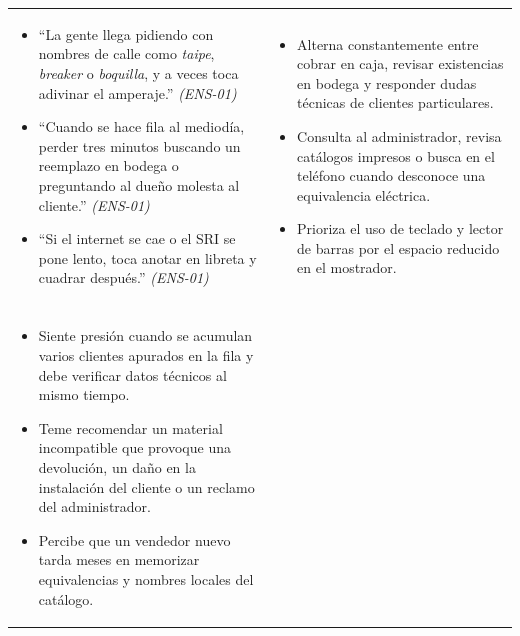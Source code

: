 \vspace{4pt}
{\small
\noindent\begin{tabularx}{\linewidth}{|Y|Y|}
\hline
{} & \\
\hline
\begin{itemize}[leftmargin=12pt,itemsep=2pt,topsep=2pt]
    \item ``La gente llega pidiendo con nombres de calle como \emph{taipe}, \emph{breaker} o \emph{boquilla}, y a veces toca adivinar el amperaje.'' \textit{(ENS-01)}
    \item ``Cuando se hace fila al mediod\'ia, perder tres minutos buscando un reemplazo en bodega o preguntando al due\~no molesta al cliente.'' \textit{(ENS-01)}
    \item ``Si el internet se cae o el SRI se pone lento, toca anotar en libreta y cuadrar despu\'es.'' \textit{(ENS-01)}
\end{itemize}
&
\begin{itemize}[leftmargin=12pt,itemsep=2pt,topsep=2pt]
    \item Alterna constantemente entre cobrar en caja, revisar existencias en bodega y responder dudas t\'ecnicas de clientes particulares.
    \item Consulta al administrador, revisa cat\'alogos impresos o busca en el tel\'efono cuando desconoce una equivalencia el\'ectrica.
    \item Prioriza el uso de teclado y lector de barras por el espacio reducido en el mostrador.
\end{itemize}\\
\hline
{} & \\
\hline
\begin{itemize}[leftmargin=12pt,itemsep=2pt,topsep=2pt]
    \item Siente presi\'on cuando se acumulan varios clientes apurados en la fila y debe verificar datos t\'ecnicos al mismo tiempo.
    \item Teme recomendar un material incompatible que provoque una devoluci\'on, un da\~no en la instalaci\'on del cliente o un reclamo del administrador.
    \item Percibe que un vendedor nuevo tarda meses en memorizar equivalencias y nombres locales del cat\'alogo.
\end{itemize}
&
\begin{itemize}[leftmargin=12pt,itemsep=2pt,topsep=2pt]

\end{itemize}
\end{tabularx}}
